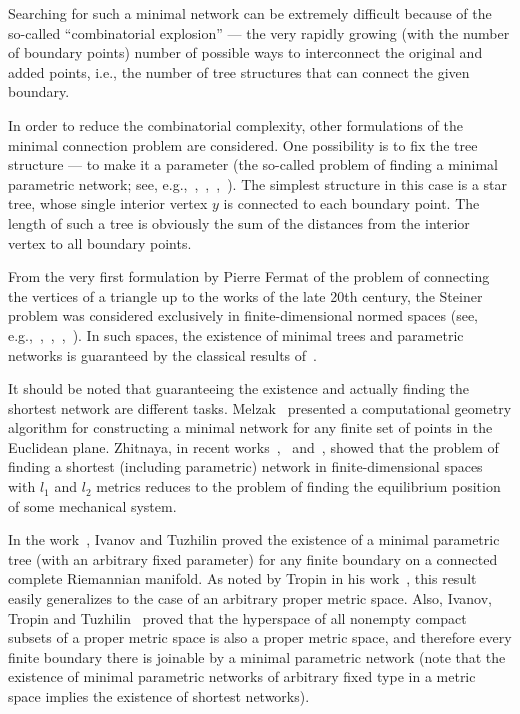 \documentclass{svproc}
\begin{document}
Searching for such a minimal network can be extremely difficult because of the so-called ``combinatorial explosion'' --- the very rapidly growing (with the number of boundary points) number of possible ways to interconnect the original and added points, i.e., the number of tree structures that can connect the given boundary.

In order to reduce the combinatorial complexity, other formulations of the minimal connection problem are considered. One possibility is to fix the tree structure --- to make it a parameter (the so-called problem of finding a minimal parametric network; see, e.g.,~\cite{IT},~\cite{Branching},~\cite{Borodin},~\cite{Tropin}). The simplest structure in this case is a star tree, whose single interior vertex $y$ is connected to each boundary point. The length of such a tree is obviously the sum of the distances from the interior vertex to all boundary points.

From the very first formulation by Pierre Fermat of the problem of connecting the vertices of a triangle up to the works of the late 20th century, the Steiner problem was considered exclusively in finite-dimensional normed spaces (see, e.g.,~\cite{Hwang},~\cite{Du},~\cite{Bern},~\cite{Cieslik}). In such spaces, the existence of minimal trees and parametric networks is guaranteed by the classical results of~\cite{Hwang}.

It should be noted that guaranteeing the existence and actually finding the shortest network are different tasks. Melzak~\cite{Melzak} presented a computational geometry algorithm for constructing a minimal network for any finite set of points in the Euclidean plane. Zhitnaya, in recent works~\cite{Zhitnaya_1},~\cite{Zhitnaya_2} and~\cite{Zhitnaya_3}, showed that the problem of finding a shortest (including parametric) network in finite-dimensional spaces with $l_1$ and $l_2$ metrics reduces to the problem of finding the equilibrium position of some mechanical system.

In the work~\cite{IT}, Ivanov and Tuzhilin proved the existence of a minimal parametric tree (with an arbitrary fixed parameter) for any finite boundary on a connected complete Riemannian manifold. As noted by Tropin in his work~\cite{Tropin}, this result easily generalizes to the case of an arbitrary proper metric space. Also, Ivanov, Tropin and Tuzhilin~\cite{ITT} proved that the hyperspace of all nonempty compact subsets of a proper metric space is also a proper metric space, and therefore every finite boundary there is joinable by a minimal parametric network (note that the existence of minimal parametric networks of arbitrary fixed type in a metric space implies the existence of shortest networks).
\end{document}
